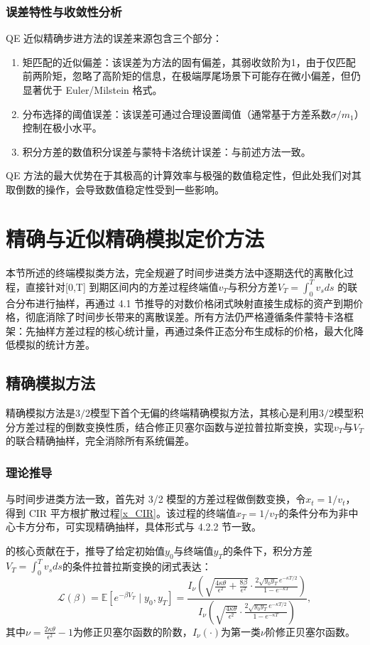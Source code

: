 \subsubsection{误差特性与收敛性分析}
QE 近似精确步进方法的误差来源包含三个部分：
\begin{enumerate}
  \item 矩匹配的近似偏差：该误差为方法的固有偏差，其弱收敛阶为1，由于仅匹配前两阶矩，忽略了高阶矩的信息，在极端厚尾场景下可能存在微小偏差，但仍显著优于 Euler/Milstein 格式。
  \item 分布选择的阈值误差：该误差可通过合理设置阈值（通常基于方差系数$\sigma/m_1$）控制在极小水平。
  \item 积分方差的数值积分误差与蒙特卡洛统计误差：与前述方法一致。
\end{enumerate}
QE 方法的最大优势在于其极高的计算效率与极强的数值稳定性，但此处我们对其取倒数的操作，会导致数值稳定性受到一些影响。

\section {精确与近似精确模拟定价方法}
本节所述的终端模拟类方法，完全规避了时间步进类方法中逐期迭代的离散化过程，直接针对[0,T]
到期区间内的方差过程终端值$v_T$与积分方差$V_T = \int_0^T v_s ds$
的联合分布进行抽样，再通过 4.1 节推导的对数价格闭式映射直接生成标的资产到期价格，彻底消除了时间步长带来的离散误差。所有方法仍严格遵循条件蒙特卡洛框架：先抽样方差过程的核心统计量，再通过条件正态分布生成标的价格，最大化降低模拟的统计方差。

\subsection{精确模拟方法}

\citet{baldeauxEXACTSIMULATION322012} 精确模拟方法是$3/2$模型下首个无偏的终端精确模拟方法，其核心是利用$3/2$模型积分方差过程的倒数变换性质，结合修正贝塞尔函数与逆拉普拉斯变换，实现$v_T$与$V_T$的联合精确抽样，完全消除所有系统偏差。

\subsubsection{理论推导}
与时间步进类方法一致，首先对 3/2 模型的方差过程做倒数变换，令$x_t​=1/v_t$​，得到 CIR 平方根扩散过程\eqref{x_CIR}。该过程的终端值$x_T​=1/v_T$​的条件分布为非中心卡方分布，可实现精确抽样，具体形式与 4.2.2 节一致。

\citet{baldeauxEXACTSIMULATION322012} 的核心贡献在于，推导了给定初始值$y_0$与终端值$y_T$的条件下，积分方差$V_T = \int_0^T v_s ds$的条件拉普拉斯变换的闭式表达：
\begin {equation}
  \mathcal {L}(\beta) = \mathbb {E}\left [ e^{-\beta V_T} \mid y_0, y_T \right] = \frac {I_{\nu}\left ( \sqrt {\frac {4\kappa\theta}{\epsilon^2} + \frac {8\beta}{\epsilon^2}} \cdot \frac {2\sqrt {y_0 y_T} e^{-\kappa T/2}}{1-e^{-\kappa T}} \right)}{I_{\nu}\left ( \sqrt {\frac {4\kappa\theta}{\epsilon^2}} \cdot \frac {2\sqrt {y_0 y_T} e^{-\kappa T/2}}{1-e^{-\kappa T}} \right)},
  \label {laplace_V_T}
\end {equation}
其中$\nu = \frac{2\kappa\theta}{\epsilon^2}-1$为修正贝塞尔函数的阶数，$I_\nu(\cdot)$为第一类$\nu$阶修正贝塞尔函数。

